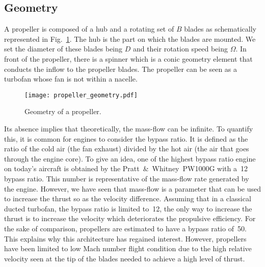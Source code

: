 
\subsection{Geometry}
\label{sub:cror_propeller_geometry}

A propeller is composed of a hub and a rotating set of 
$B$ blades as schematically represented in
Fig.~\ref{fig:cror_propeller_geometry}. The hub
is the part on which the blades are mounted.
We set the diameter of these blades being $D$
and their rotation speed being $\Omega$. 
In front of the propeller, there is a spinner which is
a conic geometry element that conducts the 
inflow to the propeller blades.
The propeller can be seen as
a turbofan whose fan is not within a nacelle.
\begin{figure}[htp]
  \centering
  \texttt{[image: propeller\_geometry.pdf]}
  \caption{Geometry of a propeller.}
  \label{fig:cror_propeller_geometry}
\end{figure}
Its absence implies that theoretically, the mass-flow can be
infinite. To quantify this, it is common for engines to
consider the bypass ratio. It is defined as the ratio of the
cold air (the fan exhaust)
divided by the hot air (the air that goes through the engine core).
To give an idea, one of the highest bypass ratio engine on today's aircraft is obtained
by the Pratt~\&~Whitney~PW1000G with a~12 bypass ratio. 
This number is representative of the mass-flow rate generated by the engine.
However, we have seen that mass-flow is a parameter that can be used to increase
the thrust so as the velocity difference. Assuming that in a classical ducted turbofan, 
the bypass ratio is limited to~12, the only
way to increase the thrust is to increase the 
velocity which deteriorates the propulsive efficiency.
For the sake of comparison, 
propellers are estimated to have a bypass ratio of~50. 
This explains why this architecture has
regained interest. However, propellers
have been limited to low Mach number flight condition
due to the high relative velocity seen at the tip of the blades
needed to achieve a high level of thrust.

